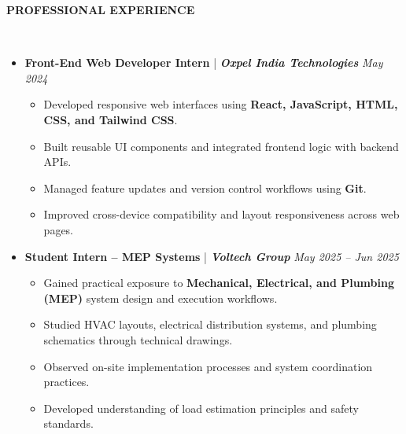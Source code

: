 \documentclass[10pt,a4paper]{article}
\newcommand{\resheading}[1]{{\small \colorbox{mygrey}{\begin{minipage}{0.99\textwidth}{\textbf{#1 \vphantom{p\^{E}}}}\end{minipage}}}}
\begin{document}
\noindent
\resheading{\textbf{PROFESSIONAL EXPERIENCE}}\\[-0.4cm]
\begin{itemize}[noitemsep,nolistsep]

\item \textbf{Front-End Web Developer Intern} | \textbf{\emph{Oxpel India Technologies}} \hfill \emph{May 2024}
\begin{itemize}[noitemsep]
    \item Developed responsive web interfaces using \textbf{React, JavaScript, HTML, CSS, and Tailwind CSS}.
    \item Built reusable UI components and integrated frontend logic with backend APIs.
    \item Managed feature updates and version control workflows using \textbf{Git}.
    \item Improved cross-device compatibility and layout responsiveness across web pages.
\end{itemize}

\item \textbf{Student Intern – MEP Systems} | \textbf{\emph{Voltech Group}} \hfill \emph{May 2025 – Jun 2025}
\begin{itemize}[noitemsep]
    \item Gained practical exposure to \textbf{Mechanical, Electrical, and Plumbing (MEP)} system design and execution workflows.
    \item Studied HVAC layouts, electrical distribution systems, and plumbing schematics through technical drawings.
    \item Observed on-site implementation processes and system coordination practices.
    \item Developed understanding of load estimation principles and safety standards.
\end{itemize}


\end{itemize}
\end{document}
